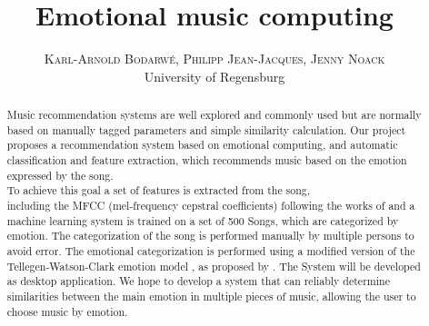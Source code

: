 

\title{\vspace{-15mm}\fontsize{24pt}{10pt}\selectfont\textbf{Emotional music computing}} %
\author{
	\large
	\textsc{Karl-Arnold Bodarwé, Philipp Jean-Jacques, Jenny Noack}\\
	\normalsize University of Regensburg \\ %
	\vspace{-5mm}
}
\date{}



\maketitle
\thispagestyle{fancy}

\begin{abstract}
Music recommendation systems are well explored and commonly used but are normally based on
manually tagged parameters and simple similarity calculation. Our project proposes a recommendation system based on emotional computing, and automatic classification and feature extraction, which recommends music based on the emotion expressed by the song.\\
To achieve this goal a set of features is extracted from the song,\\ including the MFCC (mel-frequency cepstral coefficients) following the works of \citet{Mckinney2003} and a machine learning system is trained on a set of 500 Songs, which are categorized by emotion. The categorization of the song is performed manually by multiple persons to avoid error. The emotional categorization is performed using a modified version of the Tellegen-Watson-Clark emotion model \citep{Tellegen1999}, as proposed by \citet{Trohidis2011}. 
The System will be developed as desktop application. We hope to develop a system that can reliably determine similarities between the main emotion in multiple pieces of music, allowing the user to choose music by emotion.
\end{abstract}

